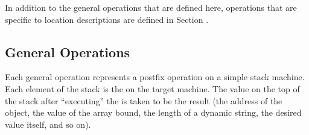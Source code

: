 In addition to the
general operations that are defined here, operations that are
specific to location descriptions are defined in 
Section .

\subsection{General Operations}
\label{chap:generaloperations}
Each general operation represents a postfix operation on
a simple stack machine. Each element of the stack is the
 on the target machine. 
The value on the
top of the stack after ``executing'' the 
is 
taken to be the result (the address of the object, the
value of the array bound, the length of a dynamic string,
the desired value itself, and so on).

